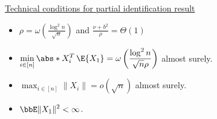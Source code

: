 \documentclass[aspectratio=169]{beamer}
\theoremstyle{remark}
\begin{document}
\begin{frame}
    \underline{Technical conditions for partial identification result} \\
    \vspace{6mm}
    \begin{itemize}
        \setlength{\itemsep}{1.75em}
        \item $\rho = \omega \left( \displaystyle \frac{ \log^2 n }{ \sqrt{n} } \right)$ and $\displaystyle \frac{ \nu + b^2 }{ \rho } = \Theta( 1 )$
        \item $\displaystyle \min_{i \in [n]} \abs*{X_i^T \, \E{X_1}} = \omega\left( \frac{ \log^2 n }{ \sqrt{ n } \rho } \right)$ almost surely.
        \item $\displaystyle \max_{i \in [n]} \| X_i \| = o(\sqrt{n})$ almost surely.
        \item $\displaystyle \bbE \| X_1 \|^2 < \infty$.
    \end{itemize}
\end{frame}
\end{document}
